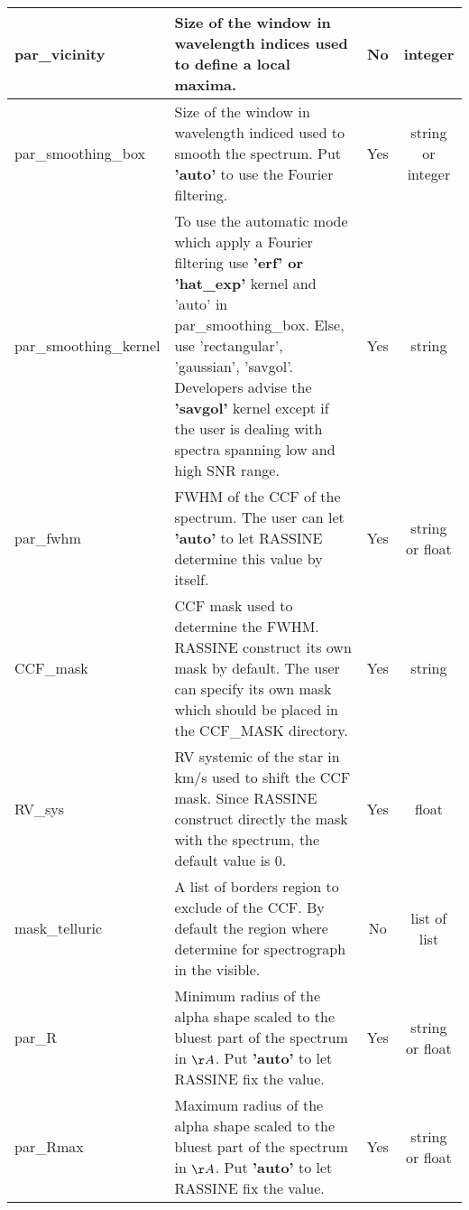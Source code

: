 \documentclass[10pt]{article}
\begin{document}
\begin{table}
\begin{tabular}{| l | p{80mm} | c | c |}
		par\_vicinity &  Size of the window in wavelength indices used to define a local maxima.  & No & integer \\ \hline 		
		par\_smoothing\_box & Size of the window in wavelength indiced used to smooth the spectrum. Put \textbf{'auto'} to use the Fourier filtering. & Yes & string or integer \\ \hline 		
		par\_smoothing\_kernel &  To use the automatic mode which apply a Fourier filtering use \textbf{'erf' or 'hat\_exp'} kernel and 'auto' in par\_smoothing\_box. Else, use 'rectangular', 'gaussian', 'savgol'. Developers advise the \textbf{'savgol'} kernel except if the user is dealing with spectra spanning low and high SNR range.   & Yes & string \\ \hline 		
		par\_fwhm  & FWHM of the CCF of the spectrum. The user can let \textbf{'auto' }to let RASSINE determine this value by itself. & Yes & string or float \\ \hline 
		CCF\_mask & CCF mask used to determine the FWHM. RASSINE construct its own mask by default. The user can specify its own mask which should be placed in the CCF\_MASK directory.  & Yes & string \\ \hline 		
		RV\_sys  & RV systemic of the star in km/s used to shift the CCF mask. Since RASSINE construct directly the mask with the spectrum, the default value is 0.   & Yes & float \\ \hline 		
		mask\_telluric   & A list of borders region to exclude of the CCF. By default the region where determine for spectrograph in the visible.   & No & list of list  \\ \hline 		
		par\_R  & Minimum radius of the alpha shape scaled to the bluest part of the spectrum in $\AA$. Put \textbf{'auto'} to let RASSINE fix the value. & Yes & string or float \\ \hline 		
		par\_Rmax &  Maximum radius of the alpha shape scaled to the bluest part of the spectrum in $\AA$. Put \textbf{'auto'} to let RASSINE fix the value. & Yes & string or float  \\ \hline 						
	\end{tabular}
\end{table}
\end{document}
